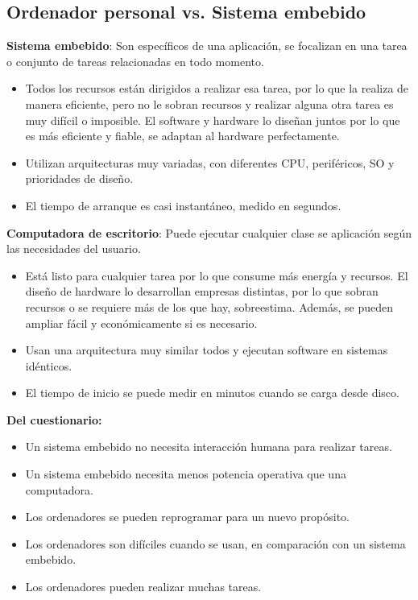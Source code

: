 \documentclass[12pt]{report} %
\begin{document}
\subsection{Ordenador personal vs. Sistema
embebido}

\textbf{Sistema embebido}: Son específicos de una aplicación, se
focalizan en una tarea o conjunto de tareas relacionadas en todo
momento.

\begin{itemize}

\item
  Todos los recursos están dirigidos a realizar esa tarea, por lo que la
  realiza de manera eficiente, pero no le sobran recursos y realizar alguna otra tarea es
  muy difícil o imposible. El software y hardware lo diseñan juntos por
  lo que es más eficiente y fiable, se adaptan al hardware
  perfectamente.
\item
  Utilizan arquitecturas muy variadas, con diferentes CPU, periféricos,
  SO y prioridades de diseño.
\item
  El tiempo de arranque es casi instantáneo, medido en segundos.
\end{itemize}

\textbf{Computadora de escritorio}: Puede ejecutar cualquier clase se
aplicación según las necesidades del usuario.

\begin{itemize}

\item
  Está listo para cualquier tarea por lo que consume más energía y
  recursos. El diseño de hardware lo desarrollan empresas distintas, por
  lo que sobran recursos o se requiere más de los que hay, sobreestima.
  Además, se pueden ampliar fácil y económicamente si es necesario.
\item
  Usan una arquitectura muy similar todos y ejecutan software en
  sistemas idénticos.
\item
  El tiempo de inicio se puede medir en minutos cuando se carga desde
  disco.
\end{itemize}

\textbf{Del cuestionario:}

\begin{itemize}

\item
  Un sistema embebido no necesita interacción humana para realizar
  tareas.
\item
  Un sistema embebido necesita menos potencia operativa que una
  computadora.
\item
  Los ordenadores se pueden reprogramar para un nuevo propósito.
\item
  Los ordenadores son difíciles cuando se usan, en comparación con un
  sistema embebido.
\item
  Los ordenadores pueden realizar muchas tareas.
\end{itemize}		
\end{document}
